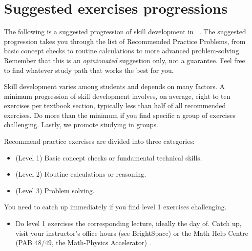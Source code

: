 \documentclass[../main.tex]{subfiles}
\begin{document}
\pagestyle{empty}
\section*{Suggested exercises progressions}

The following is a suggested progression of skill development in \thecoursesubject{}~\thecoursenumb{}.  The suggested progression takes you through the list of Recommended Practice Problems, from basic concept checks to routine calculations to more advanced problem-solving.  Remember that this is an \emph{opinionated} suggestion only, not a guarantee. Feel free to find whatever study path that works the best for you.

Skill development varies among students and depends on many factors. A minimum progression of skill development involves, on average, eight to ten exercises per textbook section, typically less than half of all recommended exercises. Do more than the minimum if you find specific a group of exercises challenging. Lastly, we promote studying in groups.

Recommend practice exercises are divided into three categories:
\begin{itemize}
  \item (Level 1) Basic concept checks or fundamental technical skills.
  \item (Level 2) Routine calculations or reasoning.
  \item (Level 3) Problem solving.
\end{itemize}

You need to catch up immediately if you find level 1 exercises challenging.
\begin{itemize}
  \item Do level 1 exercises  the corresponding lecture, ideally the day of. Catch up, visit your instructor's office hours (see BrightSpace) or the Math Help Centre (PAB 48/49, the Math-Physics Accelerator) .
\end{itemize}
\end{document}
